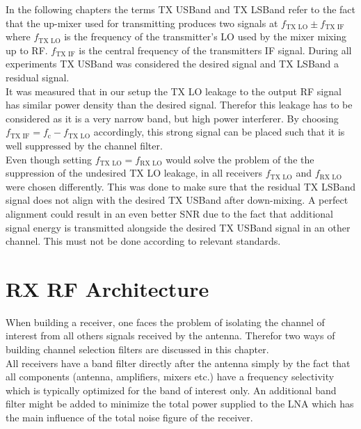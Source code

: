In the following chapters the terms \gls{TX} \gls{USBand} and \gls{TX}
\gls{LSBand} refer to the fact that the up-mixer used for transmitting
produces two signals at $f_{\text{TX LO}} \pm f_{\text{TX IF}}$ where
$f_{\text{TX LO}}$ is the frequency of the transmitter's \gls{LO}
used by the mixer mixing up to \gls{RF}. $f_{\text{TX IF}}$ is the central
frequency of the transmitters \gls{IF} signal. During all experiments
\gls{TX} \gls{USBand} was considered the desired signal and \gls{TX}
\gls{LSBand} a residual signal. \\

It was measured that in our setup the \gls{TX} \gls{LO} leakage
to the output \gls{RF} signal has similar power density than the desired
signal. Therefor this leakage has to be considered as it is a very narrow band,
but high power interferer.
By choosing $f_{\text{TX IF}} = f_{\text{c}} - f_{\text{TX LO}}$ accordingly,
this strong signal can be placed such that it is well suppressed by the channel
filter. \\

Even though setting $f_{\text{TX LO}} = f_{\text{RX LO}}$
would solve the problem of the the suppression of the
undesired \gls{TX} \gls{LO} leakage, in all receivers
$f_{\text{TX LO}}$ and $f_{\text{RX LO}}$ were chosen differently.
This was done to make sure that the residual \gls{TX} \gls{LSBand}
signal does not align with the desired \gls{TX} \gls{USBand} after
down-mixing. A perfect alignment could result in an even better
\gls{SNR} due to the fact that additional signal energy is transmitted
alongside the desired \gls{TX} \gls{USBand} signal in an other channel.
This must not be done according to relevant standards. \\

\section{RX RF Architecture}
When building a receiver, one faces the problem of isolating the channel of
interest from all others signals received by the antenna. Therefor
two ways of building channel selection filters are discussed in this
chapter. \\

All receivers have a band filter directly after the antenna simply by the
fact that all components (antenna, amplifiers, mixers etc.) have a frequency
selectivity which is typically optimized for the band of interest only.
An additional band filter might be added to minimize the total power supplied
to the \gls{LNA} which has the main influence of the total noise figure of
the receiver. \\

